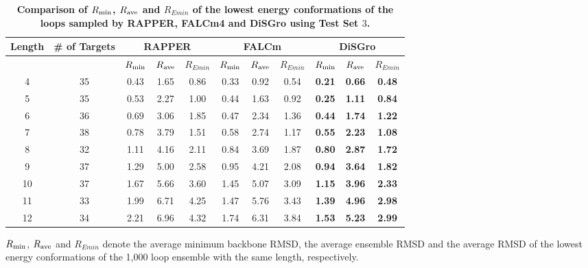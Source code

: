 \begin{table}[!h]
\caption{ \bf{Comparison of $R_{\rm min}$, $R_{\rm ave}$ and
$R_{Emin}$ of the lowest energy conformations of the loops sampled
by RAPPER, FALCm4 and {\sc DiSGro} using Test Set $3$.}}
\begin{tabular}{|c|c| c c c| c c c | c c c|}
\hline \cline{3-5} \cline{6-8} \cline{9-11}
Length &  \# of Targets & \multicolumn{3}{c|}{RAPPER} & \multicolumn{3}{c|}{FALCm} & \multicolumn{3}{c|}{{\sc DiSGro}} \\
\hline
    & & $R_{\rm min}$ & $R_{\rm ave}$ & $R_{Emin}$ & $R_{\rm min}$ & $R_{\rm ave}$ & $R_{Emin}$ & $R_{\rm min}$ & $R_{\rm ave}$ & $R_{Emin}$\\
\hline
    4 & 35 & 0.43 & 1.65 & 0.86 & 0.33 & 0.92 & 0.54 &\textbf{0.21} & \textbf{0.66} & \textbf{0.48}\\
    5 & 35 & 0.53 & 2.27 & 1.00 & 0.44 & 1.63 & 0.92 &\textbf{0.25} & \textbf{1.11} & \textbf{0.84}\\
    6 & 36 & 0.69 & 3.06 & 1.85 & 0.47 & 2.34 & 1.36 &\textbf{0.44} & \textbf{1.74} & \textbf{1.22}\\
    7 & 38 & 0.78 & 3.79 & 1.51 & 0.58 & 2.74 & 1.17 &\textbf{0.55} & \textbf{2.23} & \textbf{1.08}\\
    8 & 32 & 1.11 & 4.16 & 2.11 & 0.84 & 3.69 & 1.87 &\textbf{0.80} & \textbf{2.87} & \textbf{1.72}\\
    9 & 37 & 1.29 & 5.00 & 2.58 & 0.95 & 4.21 & 2.08 &\textbf{0.94} & \textbf{3.64} & \textbf{1.82}\\
    10 & 37 & 1.67 & 5.66 & 3.60 & 1.45 & 5.07 & 3.09 &\textbf{1.15} & \textbf{3.96} & \textbf{2.33}\\
    11 & 33 & 1.99 & 6.71 & 4.25 & 1.47 & 5.76 & 3.43 &\textbf{1.39} & \textbf{4.96} & \textbf{2.98}\\
    12 & 34 & 2.21 & 6.96 & 4.32 & 1.74 & 6.31 & 3.84 &\textbf{1.53} & \textbf{5.23} & \textbf{2.99}\\
\hline
\end{tabular}
\begin{flushleft}$R_{\rm min}$, $R_{\rm ave}$ and $R_{Emin}$ denote the
average minimum backbone RMSD, the average ensemble RMSD and the
average RMSD of the lowest energy conformations of the 1,000 loop
ensemble with the same length, respectively.
\end{flushleft}
\label{tab:falcm}
\end{table}
